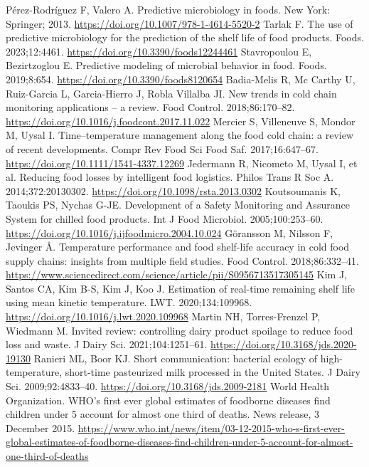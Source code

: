  Pérez-Rodríguez F, Valero A. Predictive microbiology in foods. New York: Springer; 2013. \url{https://doi.org/10.1007/978-1-4614-5520-2}
 Tarlak F. The use of predictive microbiology for the prediction of the shelf life of food products. Foods. 2023;12:4461. \url{https://doi.org/10.3390/foods12244461}
 Stavropoulou E, Bezirtzoglou E. Predictive modeling of microbial behavior in food. Foods. 2019;8:654. \url{https://doi.org/10.3390/foods8120654}
 Badia-Melis R, Mc Carthy U, Ruiz-Garcia L, Garcia-Hierro J, Robla Villalba JI. New trends in cold chain monitoring applications -- a review. Food Control. 2018;86:170--82. \url{https://doi.org/10.1016/j.foodcont.2017.11.022}
 Mercier S, Villeneuve S, Mondor M, Uysal I. Time--temperature management along the food cold chain: a review of recent developments. Compr Rev Food Sci Food Saf. 2017;16:647--67. \url{https://doi.org/10.1111/1541-4337.12269}
 Jedermann R, Nicometo M, Uysal I, et al. Reducing food losses by intelligent food logistics. Philos Trans R Soc A. 2014;372:20130302. \url{https://doi.org/10.1098/rsta.2013.0302}
 Koutsoumanis K, Taoukis PS, Nychas G-JE. Development of a Safety Monitoring and Assurance System for chilled food products. Int J Food Microbiol. 2005;100:253--60. \url{https://doi.org/10.1016/j.ijfoodmicro.2004.10.024}
 Göransson M, Nilsson F, Jevinger Å. Temperature performance and food shelf-life accuracy in cold food supply chains: insights from multiple field studies. Food Control. 2018;86:332--41. \url{https://www.sciencedirect.com/science/article/pii/S0956713517305145}
 Kim J, Santos CA, Kim B-S, Kim J, Koo J. Estimation of real-time remaining shelf life using mean kinetic temperature. LWT. 2020;134:109968. \url{https://doi.org/10.1016/j.lwt.2020.109968}
 Martin NH, Torres-Frenzel P, Wiedmann M. Invited review: controlling dairy product spoilage to reduce food loss and waste. J Dairy Sci. 2021;104:1251--61. \url{https://doi.org/10.3168/jds.2020-19130}
 Ranieri ML, Boor KJ. Short communication: bacterial ecology of high-temperature, short-time pasteurized milk processed in the United States. J Dairy Sci. 2009;92:4833--40. \url{https://doi.org/10.3168/jds.2009-2181}
 World Health Organization. WHO's first ever global estimates of foodborne diseases find children under 5 account for almost one third of deaths. News release, 3 December 2015. \url{https://www.who.int/news/item/03-12-2015-who-s-first-ever-global-estimates-of-foodborne-diseases-find-children-under-5-account-for-almost-one-third-of-deaths}
